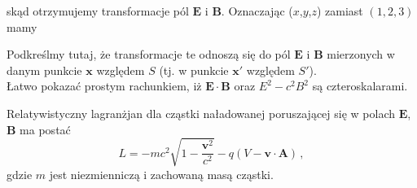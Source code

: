 \documentclass[../main.tex]{subfiles}
\begin{document}
skąd otrzymujemy transformacje pól \(\mathbf{E}\) i \(\mathbf{B}\). Oznaczając (\(x\),\(y\),\(z\))
zamiast \((1,2,3)\) mamy\\

\noindent{}
\medskip

Podkreślmy tutaj, że transformacje te odnoszą się do pól \(\mathbf{E}\) i \(\mathbf{B}\) mierzonych
w danym punkcie \(\mathbf{x}\) względem \(S\) (tj. w punkcie \(\mathbf{x}'\) względem \(S'\)).\\
Łatwo pokazać prostym rachunkiem, iż \(\mathbf{E}\cdot\mathbf{B}\) oraz \(E^2-c^2B^2\) są
czteroskalarami.
\medskip

Relatywistyczny lagranżjan dla cząstki naładowanej poruszającej się w polach \(\mathbf{E}\),
\(\mathbf{B}\) ma postać
\begin{equation*}
    L=-mc^2\sqrt{1-\frac{\mathbf{v}^2}{c^2}}-q(V-\mathbf{v}\cdot\mathbf{A})\,,
\end{equation*}
gdzie \(m\) jest niezmienniczą i zachowaną masą cząstki.
\medskip
\end{document}
